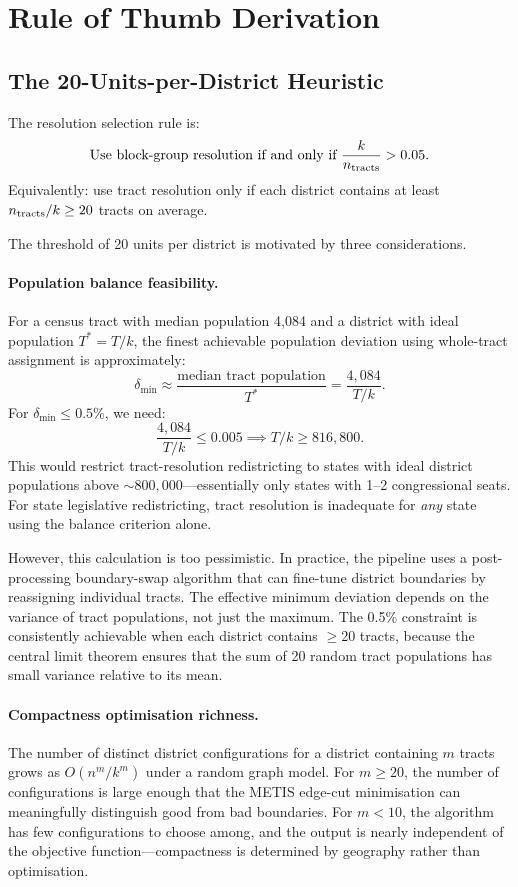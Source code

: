 \section{Rule of Thumb Derivation}
\label{sec:rule}

\subsection{The 20-Units-per-District Heuristic}
\label{sec:rule:heuristic}

The resolution selection rule is:
\[
  \text{Use block-group resolution if and only if } \frac{k}{n_{\rm tracts}} > 0.05.
\]
Equivalently: use tract resolution only if each district contains at least
$n_{\rm tracts}/k \geq 20$ tracts on average.

The threshold of 20 units per district is motivated by three considerations.

\paragraph{Population balance feasibility.}
For a census tract with median population 4,084 and a district with ideal
population $T^* = T/k$, the finest achievable population deviation using
whole-tract assignment is approximately:
\[
  \delta_{\min} \approx \frac{\text{median tract population}}{T^*}
  = \frac{4{,}084}{T/k}.
\]
For $\delta_{\min} \leq 0.5\%$, we need:
\[
  \frac{4{,}084}{T/k} \leq 0.005 \implies T/k \geq 816{,}800.
\]
This would restrict tract-resolution redistricting to states with ideal district
populations above $\sim\!800,000$---essentially only states with 1--2 congressional
seats. For state legislative redistricting, tract resolution is inadequate
for \emph{any} state using the balance criterion alone.

However, this calculation is too pessimistic. In practice, the pipeline
uses a post-processing boundary-swap algorithm that can fine-tune district
boundaries by reassigning individual tracts. The effective minimum deviation
depends on the variance of tract populations, not just the maximum. The 0.5\%
constraint is consistently achievable when each district contains $\geq 20$
tracts, because the central limit theorem ensures that the sum of 20 random
tract populations has small variance relative to its mean.

\paragraph{Compactness optimisation richness.}
The number of distinct district configurations for a district containing
$m$ tracts grows as $O(n^m / k^m)$ under a random graph model. For $m \geq 20$,
the number of configurations is large enough that the METIS edge-cut minimisation
can meaningfully distinguish good from bad boundaries. For $m < 10$,
the algorithm has few configurations to choose among, and the output is
nearly independent of the objective function---compactness is determined
by geography rather than optimisation.

